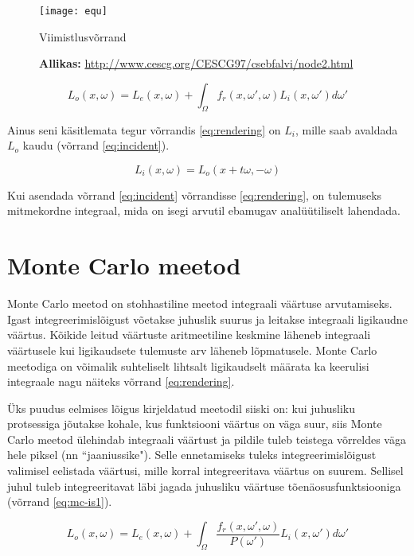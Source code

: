 \documentclass[a4paper,12pt]{report}
\begin{document}
\begin{figure}[h]
\centering
\texttt{[image: equ]}
\caption{Viimistlusvõrrand}
\caption*{\textbf{Allikas:} \url{http://www.cescg.org/CESCG97/csebfalvi/node2.html}}
\label{fig:equation}
\end{figure}

\begin{equation} \label{eq:rendering}
L_o(x, \omega) = L_e(x, \omega) + \int_\Omega f_r(x, \omega', \omega) L_i(x, \omega') d\omega'
\end{equation}

Ainus seni käsitlemata tegur võrrandis \ref{eq:rendering} on \(L_i\),
mille saab avaldada \(L_o\) kaudu (võrrand \ref{eq:incident}). 

\begin{equation} \label{eq:incident}
L_i(x, \omega) = L_o(x + t\omega, -\omega)
\end{equation}

Kui asendada võrrand \ref{eq:incident} võrrandisse \ref{eq:rendering},
on tulemuseks mitmekordne integraal, mida on isegi arvutil ebamugav
analüütiliselt lahendada.

\section{Monte Carlo meetod}
Monte Carlo meetod on stohhastiline meetod integraali väärtuse arvutamiseks.
Igast integreerimislõigust võetakse juhuslik suurus ja leitakse integraali
ligikaudne väärtus. Kõikide leitud väärtuste aritmeetiline keskmine
läheneb integraali väärtusele kui ligikaudsete tulemuste arv läheneb
lõpmatusele. Monte Carlo meetodiga on võimalik suhteliselt lihtsalt
ligikaudselt määrata ka keerulisi integraale nagu näiteks võrrand \ref{eq:rendering}.

Üks puudus eelmises lõigus kirjeldatud meetodil siiski on: kui juhusliku
protsessiga jõutakse kohale, kus funktsiooni väärtus on väga suur, siis
Monte Carlo meetod ülehindab integraali väärtust ja pildile tuleb teistega
võrreldes väga hele piksel (nn ``jaaniussike"). Selle ennetamiseks tuleks
integreerimislõigust valimisel eelistada väärtusi, mille korral
integreeritava väärtus on suurem. Sellisel juhul tuleb integreeritavat
läbi jagada juhusliku väärtuse tõenäosusfunktsiooniga (võrrand \ref{eq:mc-is1}).

\begin{equation} \label{eq:mc-is1}
L_o(x, \omega) = L_e(x, \omega) + \int_\Omega \frac{f_r(x, \omega', \omega)}{P(\omega')} L_i(x, \omega') d\omega'
\end{equation}
\end{document}
